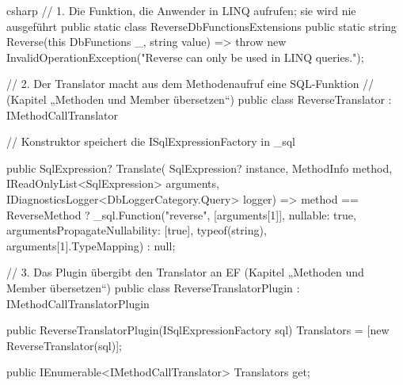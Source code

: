 \begin{sourcecode}{csharp}
// 1. Die Funktion, die Anwender in LINQ aufrufen; sie wird nie ausgeführt
public static class ReverseDbFunctionsExtensions
{
    public static string Reverse(this DbFunctions _, string value)
        => throw new InvalidOperationException("Reverse can only be used in LINQ queries.");
}

// 2. Der Translator macht aus dem Methodenaufruf eine SQL-Funktion
//    (Kapitel „Methoden und Member übersetzen“)
public class ReverseTranslator : IMethodCallTranslator
{
    // Konstruktor speichert die ISqlExpressionFactory in _sql

    public SqlExpression? Translate(
        SqlExpression? instance, MethodInfo method, IReadOnlyList<SqlExpression> arguments,
        IDiagnosticsLogger<DbLoggerCategory.Query> logger)
        => method == ReverseMethod
            ? _sql.Function("reverse", [arguments[1]], nullable: true,
                argumentsPropagateNullability: [true], typeof(string),
                arguments[1].TypeMapping)
            : null;
}

// 3. Das Plugin übergibt den Translator an EF (Kapitel „Methoden und Member übersetzen“)
public class ReverseTranslatorPlugin : IMethodCallTranslatorPlugin
{
    public ReverseTranslatorPlugin(ISqlExpressionFactory sql)
    {
        Translators = [new ReverseTranslator(sql)];
    }

    public IEnumerable<IMethodCallTranslator> Translators { get; }
}
\end{sourcecode}

